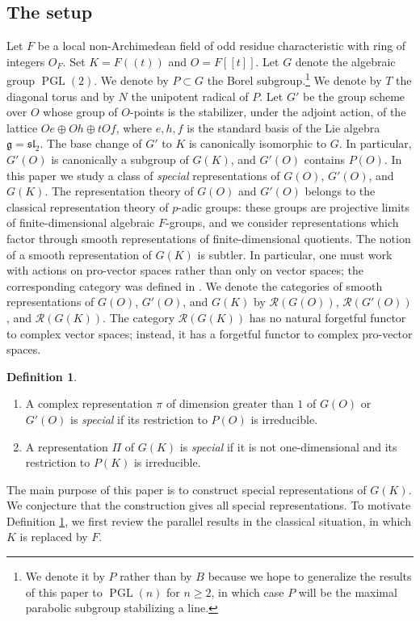 \documentclass[11pt,a4paper,twoside]{amsart}
\theoremstyle{definition}
\newtheorem{definition}[theorem]{Definition}
\theoremstyle{remark}
\newcommand{\mcR}{\mathcal R}
\newcommand{\fg}{\mathfrak g}
\newcommand{\PGL}{\operatorname{PGL}}
\begin{document}
\subsection{The setup}
Let $F$ be a local non-Archimedean field of odd residue characteristic with ring of integers $O_F$. Set $K=F((t))$ and $O=F[[t]]$. Let $G$ denote the algebraic group $\PGL(2)$. We denote by $P\subset G$ the Borel subgroup.\footnote{We denote it by $P$ rather than by $B$ because we hope to generalize the results of this paper to $\PGL(n)$ for $n\geq2$, in which case $P$ will be the maximal parabolic subgroup stabilizing a line.} We denote by $T$ the diagonal torus and by $N$ the unipotent radical of $P$.
Let $G'$ be the group scheme over $O$ whose group of $O$-points is the stabilizer, under the adjoint action, of the lattice $Oe\oplus Oh\oplus tOf$, where $e,h,f$ is the standard basis of the Lie algebra $\fg=\mathfrak{sl}_2$. The base change of $G'$ to $K$ is canonically isomorphic to $G$. In particular, $G'(O)$ is canonically a subgroup of $G(K)$, and $G'(O)$ contains $P(O)$.
In this paper we study a class of \emph{special} representations of $G(O)$, $G'(O)$, and $G(K)$. The representation theory of $G(O)$ and $G'(O)$ belongs to the classical representation theory of $p$-adic groups: these groups are projective limits of finite-dimensional algebraic $F$-groups, and we consider representations which factor through smooth representations of finite-dimensional quotients. The notion of a smooth representation of $G(K)$ is subtler. In particular, one must work with actions on pro-vector spaces rather than only on vector spaces; the corresponding category was defined in \cite{GK}. We denote the categories of smooth representations of $G(O)$, $G'(O)$, and $G(K)$ by $\mcR(G(O))$, $\mcR(G'(O))$, and $\mcR(G(K))$. The category $\mcR(G(K))$ has no natural forgetful functor to complex vector spaces; instead, it has a forgetful functor to complex pro-vector spaces.
\begin{definition}\label{spe}
\begin{enumerate}
\item A complex representation $\pi$ of dimension greater than $1$ of $G(O)$ or $G'(O)$ is \emph{special} if its restriction to $P(O)$ is irreducible.
\item A representation $\Pi$ of $G(K)$ is \emph{special} if it is not one-dimensional and its restriction to $P(K)$ is irreducible.
\end{enumerate}
\end{definition}
The main purpose of this paper is to construct special representations of $G(K)$. We conjecture that the construction gives all special representations. To motivate Definition \ref{spe}, we first review the parallel results in the classical situation, in which $K$ is replaced by $F$.
\end{document}
